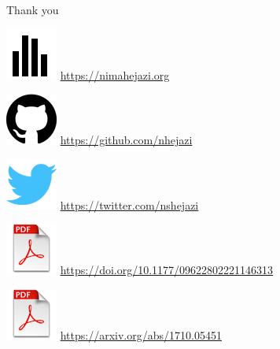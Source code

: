 \documentclass{beamer}
\begin{document}

\setbeamercovered{}
\beamerdefaultoverlayspecification{}

\begin{frame}[c,allowframebreaks]{}

\small



\end{frame}


\begin{frame}[c]{Thank you}

\includegraphics[scale=0.14]{homepage.png} \url{https://nimahejazi.org}

\vspace{2mm}
\includegraphics[scale=0.11]{github-icon.png}
  \url{https://github.com/nhejazi}

\vspace{2mm}
\includegraphics[scale=0.14]{twitter-icon.png}
  \url{https://twitter.com/nshejazi}

\vspace{2mm}
\includegraphics[scale=0.14]{pdf-icon.png}
  \url{https://doi.org/10.1177/09622802221146313}

\vspace{2mm}
\includegraphics[scale=0.14]{pdf-icon.png}
  \url{https://arxiv.org/abs/1710.05451}


\end{frame}
\end{document}
